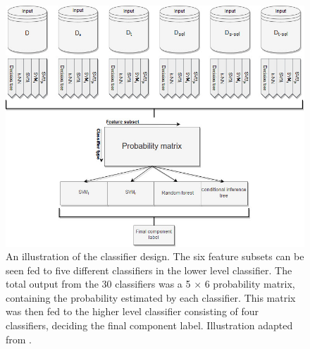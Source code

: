 \begin{figure}[H]                 
	\includegraphics[width=.95\textwidth]{figures/bMethods/classifier}  
	\caption{An illustration of the classifier design. The six feature subsets can be seen fed to five different classifiers in the lower level classifier. The total output from the 30 classifiers was a 5 $\times$ 6 probability matrix, containing the probability estimated by each classifier. This matrix was then fed to the higher level classifier consisting of four classifiers, deciding the final component label. Illustration adapted from \cite{Salimi-Khorshidi2014}.}
	\label{fig:classifier} 
\end{figure}

